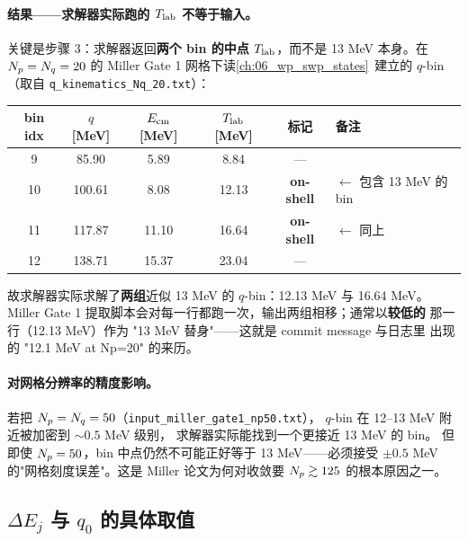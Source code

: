 \paragraph{结果——求解器实际跑的 \({T_{\text{lab}}}\) 不等于输入。}
关键是步骤 3：求解器返回\textbf{两个 bin 的中点 \({T_{\text{lab}}}\)}，而不是 13 MeV
本身。在 \(N_p = N_q = 20\) 的 Miller Gate 1 网格下读\cref{ch:06_wp_swp_states}\(\,\)
建立的 \(q\)-bin（取自 \texttt{q\_kinematics\_Nq\_20.txt}）：

\begin{center}
\begin{tabular}{cccccl}
\toprule
bin idx & \(q\) [MeV] & \(E_{\rm cm}\) [MeV] & \({T_{\text{lab}}}\) [MeV] & 标记 & 备注 \\
\midrule
9  & 85.90  & 5.89  & 8.84  & --- & \\
10 & 100.61 & 8.08  & 12.13 & \textbf{on-shell} & \(\leftarrow\) 包含 13 MeV 的 bin\\
11 & 117.87 & 11.10 & 16.64 & \textbf{on-shell} & \(\leftarrow\) 同上 \\
12 & 138.71 & 15.37 & 23.04 & --- & \\
\bottomrule
\end{tabular}
\end{center}

故求解器实际求解了\textbf{两组}近似 13 MeV 的 \(q\)-bin：12.13 MeV 与 16.64 MeV。
Miller Gate 1 提取脚本会对每一行都跑一次，输出两组相移；通常以\textbf{较低的}
那一行（12.13 MeV）作为 "13 MeV 替身"——这就是 commit message 与日志里
出现的 "12.1 MeV at Np=20" 的来历。

\paragraph{对网格分辨率的精度影响。}
若把 \(N_p = N_q = 50\)（\texttt{input\_miller\_gate1\_np50.txt}），
\(q\)-bin 在 12--13 MeV 附近被加密到 \(\sim 0.5\) MeV 级别，
求解器实际能找到一个更接近 13 MeV 的 bin。
但即使 \(N_p = 50\)，bin 中点仍然不可能正好等于 13 MeV——必须接受 \(\pm 0.5\)
MeV 的"网格刻度误差"。这是 Miller 论文为何对收敛要 \(N_p \gtrsim 125\)
的根本原因之一。

\subsection{\(\Delta E_j\) 与 \(q_0\) 的具体取值}
\label{subsec:ch14-deltaE-q0}

